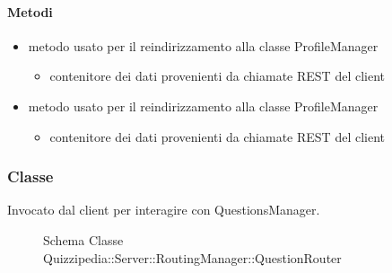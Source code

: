 \paragraph{Metodi}
\begin{itemize}
\item {}
\newline
metodo usato per il reindirizzamento alla classe ProfileManager
\newline
{}
\newline
\begin{itemize}
\item {}
\newline
contenitore dei dati provenienti da chiamate REST del client
\end{itemize}
\item {}
\newline
metodo usato per il reindirizzamento alla classe ProfileManager
\newline
{}
\newline
\begin{itemize}
\item {}
\newline
contenitore dei dati provenienti da chiamate REST del client
\end{itemize}
\end{itemize}
\subsubsection{Classe }
Invocato dal client per interagire con QuestionsManager.
\begin{figure}[H]
\centering
\noindent{}
\caption[Schema Classe QuestionRouter]{Schema Classe Quizzipedia::Server::RoutingManager::QuestionRouter}
\end{figure}
